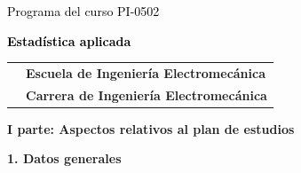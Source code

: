 \documentclass[letterpaper]{article}%
\begin{document}
%
\normalsize%
\thispagestyle{empty}%
%
\vspace*{100mm}%
\par\fontsize{14}{0}\selectfont \textcolor{black}{Programa del curso PI{-}0502}%
\par\fontsize{18}{25}\selectfont \textbf{\textcolor{black}{Estadística aplicada}}%
\vspace*{15mm}%
\newline%
\begin{tabularx}{\textwidth}{m{}m{}}%
&\hspace*{0mm}\fontsize{12}{0}\selectfont \textbf{\textcolor{gris}{Escuela de Ingeniería Electromecánica}}\\%
[-12pt]%
&\hspace*{0mm}\fontsize{12}{0}\selectfont \textbf{\textcolor{gris}{Carrera de Ingeniería Electromecánica}}\\%
\end{tabularx}%
\newpage%
\pagestyle{headfoot}%
\par\fontsize{14}{0}\selectfont \textbf{\textcolor{parte}{I parte: Aspectos relativos al plan de estudios}}%
\par\hspace*{2mm}\fontsize{12}{14}\selectfont \textbf{\textcolor{parte}{1. Datos generales}}%
\vspace*{3mm}%
\newline%
\fontsize{10}{12}\selectfont %
\end{document}
